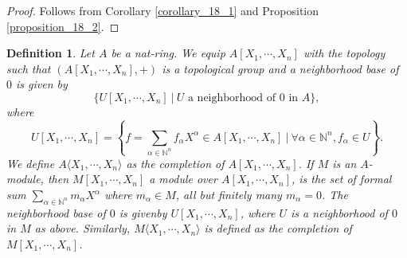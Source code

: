 \documentclass[8pt]{article}
\numberwithin{equation}{section}
\newtheorem{definition}{Definition}[subsection]
\newcommand{\N}[0]{\mathbb{N}}
\newcommand{\sep}[0]{\:|\:}
\begin{document}
\begin{proof}
    Follows from Corollary \ref{corollary_18_1} and Proposition \ref{proposition_18_2}.
\end{proof}

\begin{definition}
    \label{definition_19_1}
    Let $A$ be a nat-ring. We equip $A[X_1,\cdots,X_n]$ with the topology such that $(A[X_1,\cdots,X_n],+)$ is a topological group and a neighborhood base of $0$ is given by 
    \begin{equation*}
        \{U[X_1,\cdots,X_n]\sep \text{$U$ a neighborhood of $0$ in $A$}\},
    \end{equation*}
    where 
    \begin{equation*}
        U[X_1,\cdots,X_n] = \left\{f = \sum_{\alpha\in\N^n}f_\alpha X^\alpha\in A[X_1,\cdots,X_n]\sep \forall \alpha\in\N^n, f_\alpha\in U\right\}.
    \end{equation*}
    We define $A\langle X_1,\cdots,X_n\rangle $ as the completion of $A[X_1,\cdots,X_n]$. If $M$ is an $A$-module, then $M[X_1,\cdots,X_n]$ a module over $A[X_1,\cdots,X_n]$, is the set of formal sum $\sum_{\alpha\in\N^n}m_\alpha X^\alpha$ where $m_\alpha\in M$, all but finitely many $m_\alpha=0$. 
    The neighborhood base of $0$ is givenby $U[X_1,\cdots,X_n]$, where $U$ is a neighborhood of $0$ in $M$ as above. Similarly, $M\langle X_1,\cdots,X_n\rangle$ is defined as the completion of $M[X_1,\cdots,X_n]$. 
\end{definition}
\end{document}
